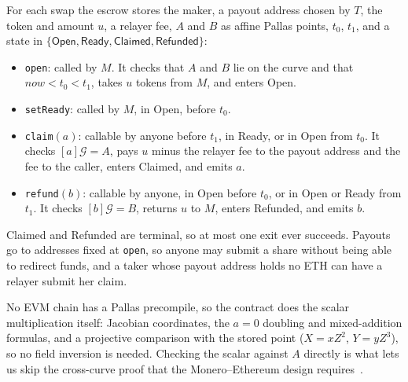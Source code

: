 \documentclass[10pt,letterpaper]{article}
\makeatletter
\renewcommand\subsection{\@startsection{subsection}{2}{\z@}{-0.9em}{0.25em}{\normalfont\normalsize\bfseries}}
\newcommand{\Gor}{\mathcal{G}}
\newcommand{\fn}[1]{\texttt{#1}}
\makeatother
\begin{document}
\subsection{Escrow contract}
For each swap the escrow stores the maker, a payout address chosen by $T$, the token and amount
$u$, a relayer fee, $A$ and $B$ as affine Pallas points, $t_0$, $t_1$, and a state in
$\{\textsf{Open}, \textsf{Ready}, \textsf{Claimed}, \textsf{Refunded}\}$:

\begin{itemize}\setlength\itemsep{0.1em}
\item \fn{open}: called by $M$. It checks that $A$ and $B$ lie on the curve and that
$\mathit{now} < t_0 < t_1$, takes $u$ tokens from $M$, and enters \textsf{Open}.
\item \fn{setReady}: called by $M$, in \textsf{Open}, before $t_0$.
\item \fn{claim}$(a)$: callable by anyone before $t_1$, in \textsf{Ready}, or in \textsf{Open} from
$t_0$. It checks $[a]\Gor = A$, pays $u$ minus the relayer fee to the payout address and the fee to
the caller, enters \textsf{Claimed}, and emits $a$.
\item \fn{refund}$(b)$: callable by anyone, in \textsf{Open} before $t_0$, or in \textsf{Open} or
\textsf{Ready} from $t_1$. It checks $[b]\Gor = B$, returns $u$ to $M$, enters \textsf{Refunded},
and emits $b$.
\end{itemize}

\textsf{Claimed} and \textsf{Refunded} are terminal, so at most one exit ever succeeds. Payouts go
to addresses fixed at \fn{open}, so anyone may submit a share without being able to redirect funds,
and a taker whose payout address holds no ETH can have a relayer submit her claim.

No EVM chain has a Pallas precompile, so the contract does the scalar multiplication itself:
Jacobian coordinates, the $a = 0$ doubling and mixed-addition formulas, and a projective comparison
with the stored point ($X = xZ^2$, $Y = yZ^3$), so no field inversion is needed. Checking the
scalar against $A$ directly is what lets us skip the cross-curve proof that the Monero--Ethereum
design requires~\cite{athanor,mrl10}.
\end{document}
